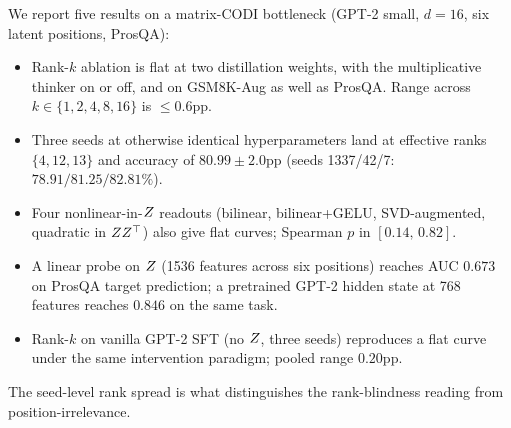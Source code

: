 We report five results on a matrix-CODI bottleneck (GPT-2 small,
$d{=}16$, six latent positions, ProsQA):

\begin{itemize}
\setlength\itemsep{2pt}
\item Rank-$k$ ablation is flat at two distillation weights, with
the multiplicative thinker on or off, and on GSM8K-Aug as well as
ProsQA. Range across $k\!\in\!\{1,2,4,8,16\}$ is $\leq 0.6$pp.
\item Three seeds at otherwise identical hyperparameters land at
effective ranks $\{4, 12, 13\}$ and accuracy of
$80.99\!\pm\!2.0$pp (seeds 1337/42/7: $78.91/81.25/82.81\%$).
\item Four nonlinear-in-$Z$ readouts (bilinear, bilinear+GELU,
SVD-augmented, quadratic in $ZZ^\top$) also give flat curves;
Spearman $p$ in $[0.14,\,0.82]$.
\item A linear probe on $Z$ (1536 features across six positions)
reaches AUC $0.673$ on ProsQA target prediction; a pretrained
GPT-2 hidden state at 768 features reaches $0.846$ on the same
task.
\item Rank-$k$ on vanilla GPT-2 SFT (no $Z$, three seeds)
reproduces a flat curve under the same intervention paradigm;
pooled range $0.20$pp.
\end{itemize}

The seed-level rank spread is what distinguishes the rank-blindness
reading from position-irrelevance.
